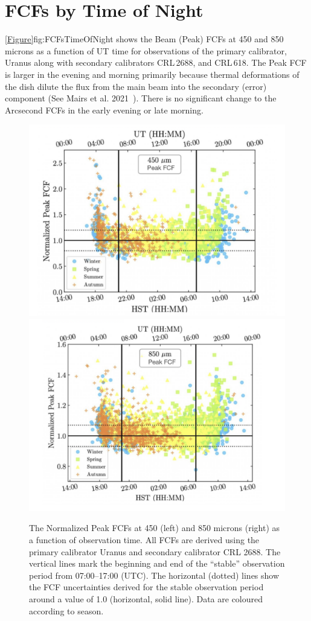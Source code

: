 \chapter{FCFs by Time of Night}
\label{app:fcfstime}

\cref{Figure}{fig:FCFsTimeOfNight}{} shows the Beam (Peak) FCFs at
450 and 850\,microns as a function of UT time for observations of the
primary calibrator, Uranus along with secondary calibrators CRL\,2688, and CRL\,618.
The Peak FCF is larger in the evening and morning primarily because thermal 
deformations of the dish dilute the flux from the main beam into the secondary 
(error) component (See Mairs et al. 2021~\cite{mairs21}). There is no significant 
change to the Arcsecond FCFs in the early evening or late morning.

\begin{figure}
\begin{center}
\includegraphics[width=0.47\linewidth]{sc21-FCFsTimeOfNight-450} \hspace{0.02\linewidth}
\includegraphics[width=0.47\linewidth]{sc21-FCFsTimeOfNight-850}
\caption[FCFs Time of Night]{The Normalized Peak FCFs at 450 (left) and 850 microns (right) 
as a function of observation time. All FCFs are derived using the primary calibrator Uranus and 
secondary calibrator CRL 2688. The vertical lines mark the beginning and end of the “stable” observation 
period from 07:00–17:00 (UTC). The horizontal (dotted) lines show the FCF uncertainties derived for the 
stable observation period around a value of 1.0 (horizontal, solid line). 
Data are coloured according to season. \label{fig:FCFsTimeOfNight}}
\end{center}
\end{figure}

